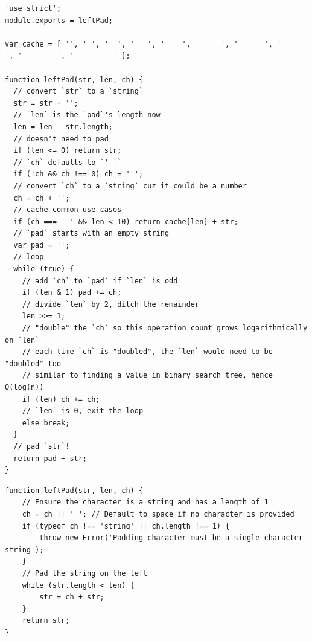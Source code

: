 \documentclass[sigplan,review,anonymous,10pt]{acmart}
\newcommand{\sys}{{\scshape Kv{\textalpha}sir}\xspace}
\newcommand{\ttt}[1]{\texttt{#1}\xspace}
\begin{document}
\begin{listing}[htpb]
\begin{verbatim}
'use strict';
module.exports = leftPad;

var cache = [ '', ' ', '  ', '   ', '    ', '     ', '      ', '       ', '        ', '         ' ];

function leftPad(str, len, ch) {
  // convert `str` to a `string`
  str = str + '';
  // `len` is the `pad`'s length now
  len = len - str.length;
  // doesn't need to pad
  if (len <= 0) return str;
  // `ch` defaults to `' '`
  if (!ch && ch !== 0) ch = ' ';
  // convert `ch` to a `string` cuz it could be a number
  ch = ch + '';
  // cache common use cases
  if (ch === ' ' && len < 10) return cache[len] + str;
  // `pad` starts with an empty string
  var pad = '';
  // loop
  while (true) {
    // add `ch` to `pad` if `len` is odd
    if (len & 1) pad += ch;
    // divide `len` by 2, ditch the remainder
    len >>= 1;
    // "double" the `ch` so this operation count grows logarithmically on `len`
    // each time `ch` is "doubled", the `len` would need to be "doubled" too
    // similar to finding a value in binary search tree, hence O(log(n))
    if (len) ch += ch;
    // `len` is 0, exit the loop
    else break;
  }
  // pad `str`!
  return pad + str;
}
  \end{verbatim}
\caption{The original \ttt{leftPad} library.}
\end{listing}

\begin{listing}[htpb]
  \begin{verbatim}
function leftPad(str, len, ch) {
    // Ensure the character is a string and has a length of 1
    ch = ch || ' '; // Default to space if no character is provided
    if (typeof ch !== 'string' || ch.length !== 1) {
        throw new Error('Padding character must be a single character string');
    }
    // Pad the string on the left
    while (str.length < len) {
        str = ch + str;
    }
    return str;
}
  \end{verbatim}
  \caption{The output of \sys, having regenerated \ttt{leftPad}.}
\end{listing}
\end{document}
